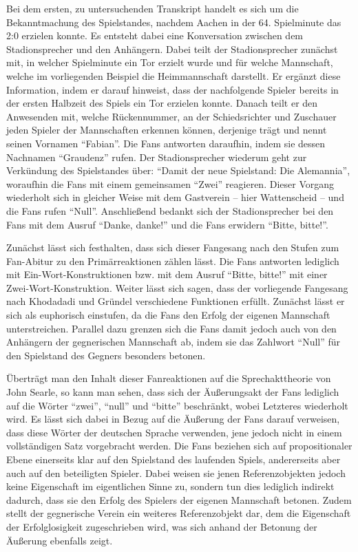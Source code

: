 Bei dem ersten, zu untersuchenden Transkript handelt es sich um die Bekanntmachung des Spielstandes, nachdem Aachen in der 64. Spielminute das 2:0 erzielen konnte.
Es entsteht dabei eine Konversation zwischen dem Stadionsprecher und den Anhängern.
Dabei teilt der Stadionsprecher zunächst mit, in welcher Spielminute ein Tor erzielt wurde und für welche Mannschaft, welche im vorliegenden Beispiel die Heimmannschaft darstellt.
Er ergänzt diese Information, indem er darauf hinweist, dass der nachfolgende Spieler bereits in der ersten Halbzeit des Spiels ein Tor erzielen konnte.
Danach teilt er den Anwesenden mit, welche Rückennummer, an der Schiedsrichter und Zuschauer jeden Spieler der Mannschaften erkennen können, derjenige trägt und nennt seinen Vornamen "`Fabian"'.
Die Fans antworten daraufhin, indem sie dessen Nachnamen "`Graudenz"' rufen.
Der Stadionsprecher wiederum geht zur Verkündung des Spielstandes über: "`Damit der neue Spielstand: Die Alemannia"', woraufhin die Fans mit einem gemeinsamen "`Zwei"' reagieren.
Dieser Vorgang wiederholt sich in gleicher Weise mit dem Gastverein – hier Wattenscheid – und die Fans rufen "`Null"'.
Anschließend bedankt sich der Stadionsprecher bei den Fans mit dem Ausruf "`Danke, danke!"' und die Fans erwidern "`Bitte, bitte!"'.

Zunächst lässt sich festhalten, dass sich dieser Fangesang nach den Stufen zum Fan-Abitur zu den Primärreaktionen zählen lässt.
Die Fans antworten lediglich mit Ein-Wort-Konstruktionen bzw. mit dem Ausruf "`Bitte, bitte!"' mit einer Zwei-Wort-Konstruktion.
Weiter lässt sich sagen, dass der vorliegende Fangesang nach Khodadadi und Gründel verschiedene Funktionen erfüllt.
Zunächst lässt er sich als euphorisch einstufen, da die Fans den Erfolg der eigenen Mannschaft unterstreichen.
Parallel dazu grenzen sich die Fans damit jedoch auch von den Anhängern der gegnerischen Mannschaft ab, indem sie das Zahlwort "`Null"' für den Spielstand des Gegners besonders betonen.

Überträgt man den Inhalt dieser Fanreaktionen auf die Sprechakttheorie von John Searle, so kann man sehen, dass sich der Äußerungsakt der Fans lediglich auf die Wörter "`zwei"', "`null"' und "`bitte"' beschränkt, wobei Letzteres wiederholt wird.
Es lässt sich dabei in Bezug auf die Äußerung der Fans darauf verweisen, dass diese Wörter der deutschen Sprache verwenden, jene jedoch nicht in einem vollständigen Satz vorgebracht werden.
Die Fans beziehen sich auf propositionaler Ebene einerseits klar auf den Spielstand des laufenden Spiels, andererseits aber auch auf den beteiligten Spieler.
Dabei weisen sie jenen Referenzobjekten jedoch keine Eigenschaft im eigentlichen Sinne zu, sondern tun dies lediglich indirekt dadurch, dass sie den Erfolg des Spielers der eigenen Mannschaft betonen.
Zudem stellt der gegnerische Verein ein weiteres Referenzobjekt dar, dem die Eigenschaft der Erfolglosigkeit zugeschrieben wird, was sich anhand der Betonung der Äußerung ebenfalls zeigt.

